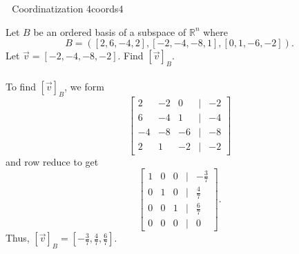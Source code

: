         \begin{example}{\Difficulty\,\Difficulty\,\Difficulty\,\,Coordinatization 4}{coords4}

            Let \(B\) be an ordered basis of a subspace of \(\mathbb{R}^n\) where
            \begin{equation*}
                B=([2,6,-4,2],[-2,-4,-8,1],[0,1,-6,-2]).
            \end{equation*}
            Let \(\vec{v}=[-2,-4,-8,-2]\). Find \([\vec{v}]_B\).
            \\
            \\
            To find \([\vec{v}]_B\), we form
            \begin{equation*}
                \begin{bmatrix}
                    2 & -2 & 0 & | & -2 \\
                    6 & -4 & 1 & | & -4 \\
                    -4 & -8 & -6 & | & -8 \\
                    2 & 1 & -2 & | & -2
                \end{bmatrix}
            \end{equation*}
            and row reduce to get
            \begin{equation*}
                \begin{bmatrix}
                    1 & 0 & 0 & | & -\frac{3}{7} \\
                    0 & 1 & 0 & | & \frac{4}{7} \\
                    0 & 0 & 1 & | & \frac{6}{7} \\
                    0 & 0 & 0 & | & 0
                \end{bmatrix}.
            \end{equation*}
            Thus, \([\vec{v}]_B=\left[-\frac{3}{7},\frac{4}{7},\frac{6}{7}\right]\).
        \end{example}
